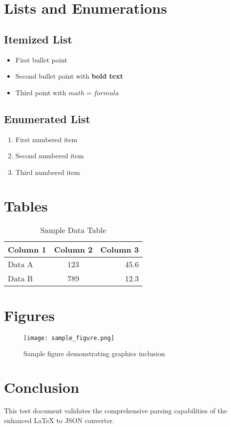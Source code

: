 \documentclass{article}
\begin{document}
\section{Lists and Enumerations}

\subsection{Itemized List}
\begin{itemize}
\item First bullet point
\item Second bullet point with \textbf{bold text}
\item Third point with $math = formula$
\end{itemize}

\subsection{Enumerated List}
\begin{enumerate}
\item First numbered item
\item Second numbered item
\item Third numbered item
\end{enumerate}

\section{Tables}

\begin{table}[h]
\centering
\caption{Sample Data Table}
\label{tab:sample}
\begin{tabular}{|l|c|r|}
\hline
Column 1 & Column 2 & Column 3 \\
\hline
Data A & 123 & 45.6 \\
Data B & 789 & 12.3 \\
\hline
\end{tabular}
\end{table}

\section{Figures}

\begin{figure}[h]
\centering
\texttt{[image: sample\_figure.png]}
\caption{Sample figure demonstrating graphics inclusion}
\label{fig:sample}
\end{figure}

\section{Conclusion}
This test document validates the comprehensive parsing capabilities 
of the enhanced LaTeX to JSON converter.
\end{document}
